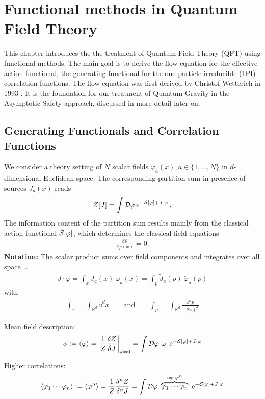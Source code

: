 \chapter{Functional methods in Quantum Field Theory}
This chapter introduces the the treatment of Quantum Field Theory (QFT) using functional methods. The main goal is to derive the flow equation for the effective action functional, the generating functional for the one-particle irreducible (1PI) correlation functions. The flow equation was first derived by Christof Wetterich in 1993 \cite{Wetterich1992}. It is the foundation for our treatment of Quantum Gravity in the Asymptotic Safety approach, discussed in more detail later on.
\section{Generating Functionals and Correlation Functions}
We consider a theory setting of $N$ scalar fields $\varphi_a(x), a \in \{1,\dots,N\}$ in $d$-dimensional Euclidean space. The corresponding partition sum in presence of sources $J_a(x)$ reads
\begin{align}
	Z[J] =  \int \D\varphi \operatorname{e}^{-\S + J\cdot\varphi}.
\end{align}
The information content of the partition sum results mainly from the classical action functional $\S$, which determines the classical field equations
\begin{align}
	\frac{\delta \mathcal{S}}{\delta\varphi(x)} = 0.
\end{align}
\textbf{Notation:} The scalar product sums over field components and integrates over all space \dots
\begin{align}
	J\cdot\varphi = \int_x J_a(x) \ \varphi_a(x) = \int_p \tilde{J}_a(p) \ \tilde{\varphi}_a(p)
\end{align}
with
\begin{align}
\int_x = \int_{\mathbb{R}^d} \dd^d x \qquad \text{and} \qquad \int_p = \int_{\mathbb{R}^d} \frac{\dd^d p}{(2\pi)^d}	
\end{align}

Mean field description:
\begin{align}
	\phi := \cf{\varphi} = \eval{\frac{1}{Z}\frac{\delta Z}{\delta J}}_{J=0} = \int \D\varphi \ \varphi \ \operatorname{e}^{-\S + J\cdot\varphi}  
\end{align}

Higher correlations:
\begin{align}
\cf{\varphi_1 \cdots \varphi_n} := \cf{\varphi^n} = \frac{1}{Z}\frac{\delta^n Z}{\delta^n J} = \int \D\varphi \ \overbrace{\varphi_1 \cdots \varphi_n}^{:= \ \varphi^n} \ \operatorname{e}^{-\S + J\cdot\varphi}  
\end{align}

